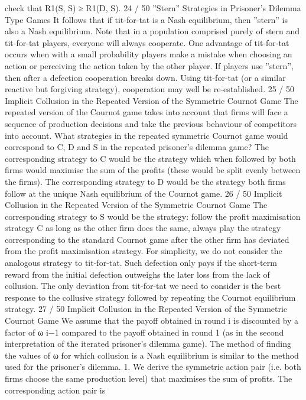 check that R1(S, S) ≥ R1(D, S).
24 / 50
”Stern” Strategies in Prisoner’s Dilemma Type Games
It follows that if tit-for-tat is a Nash equilibrium, then ”stern” is
also a Nash equilibrium.
Note that in a population comprised purely of stern and tit-for-tat
players, everyone will always cooperate.
One advantage of tit-for-tat occurs when with a small probability
players make a mistake when choosing an action or perceiving the
action taken by the other player.
If players use ”stern”, then after a defection cooperation breaks
down. Using tit-for-tat (or a similar reactive but forgiving
strategy), cooperation may well be re-established.
25 / 50
Implicit Collusion in the Repeated Version of the
Symmetric Cournot Game
The repeated version of the Cournot game takes into account that
firms will face a sequence of production decisions and take the
previous behaviour of competitors into account.
What strategies in the repeated symmetric Cournot game would
correspond to C, D and S in the repeated prisoner’s dilemma
game?
The corresponding strategy to C would be the strategy which
when followed by both firms would maximise the sum of the profits
(these would be split evenly between the firms).
The corresponding strategy to D would be the strategy both firms
follow at the unique Nash equilibrium of the Cournot game.
26 / 50
Implicit Collusion in the Repeated Version of the
Symmetric Cournot Game
The corresponding strategy to S would be the strategy: follow the
profit maximisation strategy C as long as the other firm does the
same, always play the strategy corresponding to the standard
Cournot game after the other firm has deviated from the profit
maximisation strategy.
For simplicity, we do not consider the analogous strategy to
tit-for-tat.
Such defection only pays if the short-term reward from the initial
defection outweighs the later loss from the lack of collusion. The
only deviation from tit-for-tat we need to consider is the best
response to the collusive strategy followed by repeating the
Cournot equilibrium strategy.
27 / 50
Implicit Collusion in the Repeated Version of the
Symmetric Cournot Game
We assume that the payoff obtained in round i is discounted by a
factor of ω
i−1
compared to the payoff obtained in round 1 (as in
the second interpretation of the iterated prisoner’s dilemma game).
The method of finding the values of ω for which collusion is a
Nash equilibrium is similar to the method used for the prisoner’s
dilemma.
1. We derive the symmetric action pair (i.e. both firms
choose the same production level) that maximises
the sum of profits. The corresponding action pair is
